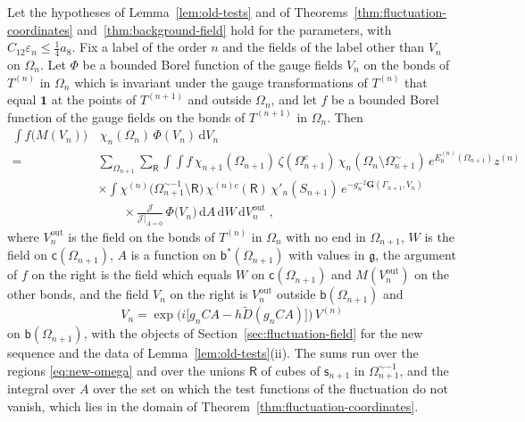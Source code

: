 \documentclass[11pt]{preprint}
\newcommand{\dd}{\mathrm{d}}
\newcommand{\id}{\mathbf 1}
\numberwithin{equation}{section}
\begin{document}
\begin{theorem}\label{thm:step-identity}
Let the hypotheses of Lemma~\ref{lem:old-tests} and of Theorems~\ref{thm:fluctuation-coordinates} and~\ref{thm:background-field} hold for the parameters, with $C_{12}\varepsilon_n \leqslant \frac{1}{4}a_8$. Fix a label of the order $n$ and the fields of the label other than $V_n$ on $\Omega_n$. Let $\Phi$ be a bounded Borel function of the gauge fields $V_n$ on the bonds of $T^{(n)}$ in $\Omega_n$ which is invariant under the gauge transformations of $T^{(n)}$ that equal $\id$ at the points of $T^{(n+1)}$ and outside $\Omega_n$, and let $f$ be a bounded Borel function of the gauge fields on the bonds of $T^{(n+1)}$ in $\Omega_n$. Then
\begin{equation}\label{eq:step-identity}
\begin{aligned}
    \int f\bigl(M(V_n)\bigr)&\,\chi_n(\Omega_n)\,\Phi(V_n)\,\dd V_n\\
    ={}& \sum_{\Omega_{n+1}}\sum_{\mathsf R}\int\!\!\int f\,\chi_{n+1}(\Omega_{n+1})\,\zeta(\Omega^c_{n+1})\,\chi_n(\Omega_n \setminus \Omega^\sim_{n+1})\,e^{E^{(n)}_0(\Omega_{n+1})}z^{(n)}\\
    &\times\int\chi^{(n)}\bigl(\Omega^{\sim-1}_{n+1} \setminus \mathsf R\bigr)\,\chi^{(n)c}(\mathsf R)\,\chi'_n(S_{n+1})\,e^{-g_n^{-2}\mathbf G(\Gamma_{n+1}, V_n)}\\
    &\qquad\times\frac{\mathcal J}{\mathcal J|_{A=0}}\,\Phi\bigl(V_n\bigr)\,\dd A\,\dd W\,\dd V^{\mathrm{out}}_n\;,
\end{aligned}
\end{equation}
where $V^{\mathrm{out}}_n$ is the field on the bonds of $T^{(n)}$ in $\Omega_n$ with no end in $\Omega_{n+1}$, $W$ is the field on $\mathsf c(\Omega_{n+1})$, $A$ is a function on $\mathsf b^*(\Omega_{n+1})$ with values in $\mathfrak g$, the argument of $f$ on the right is the field which equals $W$ on $\mathsf c(\Omega_{n+1})$ and $M(V^{\mathrm{out}}_n)$ on the other bonds, and the field $V_n$ on the right is $V^{\mathrm{out}}_n$ outside $\mathsf b(\Omega_{n+1})$ and
\begin{equation}\label{eq:step-field}
    V_n = \exp\bigl(i\bigl[g_nCA - h\tilde D(g_nCA)\bigr]\bigr)\,V^{(n)}
\end{equation}
on $\mathsf b(\Omega_{n+1})$, with the objects of Section~\ref{sec:fluctuation-field} for the new sequence and the data of Lemma~\ref{lem:old-tests}(ii). The sums run over the regions \eqref{eq:new-omega} and over the unions $\mathsf R$ of cubes of $\mathsf s_{n+1}$ in $\Omega^{\sim-1}_{n+1}$, and the integral over $A$ over the set on which the test functions of the fluctuation do not vanish, which lies in the domain of Theorem~\ref{thm:fluctuation-coordinates}.
\end{theorem}
\end{document}
